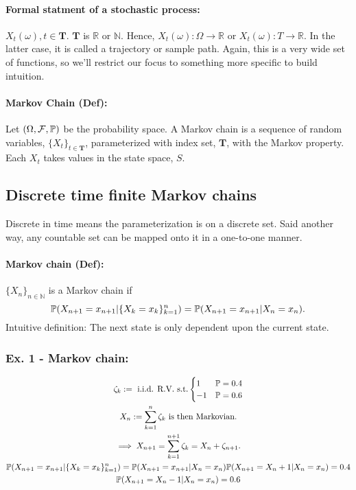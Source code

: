 \paragraph*{Formal statment of a stochastic process:} 
$X_t(\omega), t\in \bm{T}$. $\bm{T}$ is $\mathbb{R}$ or $\mathbb{N}$. Hence, $X_t(\omega): \Omega \to \mathbb{R}$ or $X_t(\omega): T\to \mathbb{R}$. In the latter case, it is called a trajectory or sample path. Again, this is a very wide set of functions, so we'll restrict our focus to something more specific to build intuition. 

\paragraph*{Markov Chain (Def): }Let $(\Omega, \mathcal{F}, \mathbb{P})$ be the probability space. A Markov chain is a sequence of  random variables, $\{X_t\}_{t\in \bm{T}}$, parameterized with index set, $\bm{T}$, with the Markov property. Each $X_t$ takes values in the state space, $S$. 

\subsection{Discrete time finite Markov chains}

Discrete in time means the parameterization is on a discrete set. Said another way, any countable set can be mapped onto it in a one-to-one manner. 

\paragraph*{Markov chain (Def): }$\{X_n\}_{n\in\mathbb{N}}$ is a Markov chain if 
\[
	\mathbb{P}( X_{n+1} = x_{n+1}| \{X_k = x_k\}_{k=1}^n) =  \mathbb{P} ( X_{n+1} = x_{n+1} | X_n = x_n ).
\]
Intuitive definition: The next state is only dependent upon the current state. 

\subsubsection*{Ex. 1 - Markov chain: } 
\begin{gather*}
	\zeta_k := \text{ i.i.d. R.V. s.t.}
		\begin{cases}
			1 & \mathbb{P} = 0.4 \\
			-1 & \mathbb{P} = 0.6 
		\end{cases} \\
	X_n := \sum\limits_{k=1}^n \zeta_k \text{ is then Markovian.} \\
	\implies X_{n+1} = \sum\limits_{k=1}^{n+1} \zeta_k = X_n + \zeta_{n+1}. \\
	\mathbb{P}( X_{n + 1} = x_{n + 1}| \{ X_k = x_k\}_{k=1}^n )
		= \mathbb{P}(  X_{n + 1} = x_{n + 1}| X_n = x_n ) 
	\mathbb{P}( X_{n+1} = X_n + 1 | X_n = x_n) = 0.4 \\
	\mathbb{P}( X_{n+1} = X_n - 1 | X_n = x_n) = 0.6 \\	
\end{gather*}

